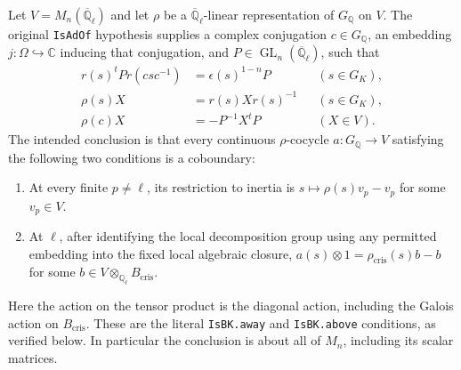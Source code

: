 Let $V=M_n(\overline{\mathbb Q}_\ell)$ and let $\rho$ be a
$\overline{\mathbb Q}_\ell$-linear representation of $G_{\mathbb Q}$
on $V$.  The original \texttt{IsAdOf} hypothesis supplies a complex
conjugation $c\in G_{\mathbb Q}$, an embedding
$j:\Omega\hookrightarrow\mathbb C$ inducing that conjugation, and
$P\in\operatorname{GL}_n(\overline{\mathbb Q}_\ell)$, such that
\begin{align}
 r(s)^tP r(csc^{-1})&=\epsilon(s)^{1-n}P &&(s\in G_K),
                 \tag{ADK.4}\\
 \rho(s)X&=r(s)Xr(s)^{-1} &&(s\in G_K),
                 \tag{ADK.5}\\
 \rho(c)X&=-P^{-1}X^tP &&(X\in V).
                 \tag{ADK.6}
\end{align}
The intended conclusion is that every continuous $\rho$-cocycle
$a:G_{\mathbb Q}\to V$ satisfying the following two conditions is a
coboundary:
\begin{enumerate}
\item At every finite $p\ne\ell$, its restriction to inertia is
  $s\mapsto\rho(s)v_p-v_p$ for some $v_p\in V$.
\item At $\ell$, after identifying the local decomposition group
  using any permitted embedding into the fixed local algebraic
  closure, $a(s)\otimes1=\rho_{\mathrm{cris}}(s)b-b$ for some
  $b\in V\otimes_{\mathbb Q_\ell}B_{\mathrm{cris}}$.
\end{enumerate}
Here the action on the tensor product is the diagonal action, including
the Galois action on $B_{\mathrm{cris}}$.  These are the literal
\texttt{IsBK.away} and \texttt{IsBK.above} conditions, as verified
below.  In particular the conclusion is about all of $M_n$, including
its scalar matrices.

